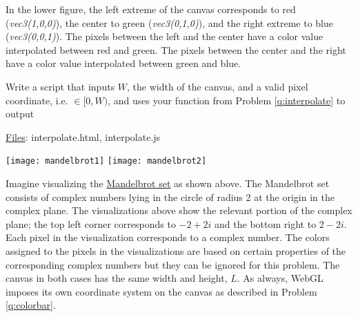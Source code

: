 \documentclass[addpoints]{exam}
\begin{document}
\begin{questions}
  In the lower figure, the left extreme of the canvas corresponds to red (\emph{vec3(1,0,0)}), the center to green (\emph{vec3(0,1,0)}), and the right extreme to blue (\emph{vec3(0,0,1)}). The pixels between the left and the center have a color value interpolated between red and green. The pixels between the center and the right have a color value interpolated between green and blue.

  Write a script that inputs $W$, the width of the canvas, and a valid pixel coordinate, i.e. $\in [0, W)$, and uses your function from Problem \ref{q:interpolate} to output
  \noindent\underline{Files}: {interpolate.html, interpolate.js}



  \begin{center}
      \texttt{[image: mandelbrot1]} \texttt{[image: mandelbrot2]}\\
  \end{center}

  Imagine visualizing the \href{http://en.wikipedia.org/wiki/Mandelbrot_set}{Mandelbrot set} as shown above. The Mandelbrot set consists of complex numbers lying in the circle of radius 2 at the origin in the complex plane. The visualizations above show the relevant portion of the complex plane; the top left corner corresponds to $-2+2i$ and the bottom right to $2-2i$. Each pixel in the visualization corresponds to a complex number. The colors assigned to the pixels in the visualizations are based on certain properties of the corresponding complex numbers but they can be ignored for this problem. The canvas in both cases has the same width and height, $L$. As always, WebGL imposes its own coordinate system on the canvas as described in Problem \ref{q:colorbar}.


\end{questions}
\end{document}
